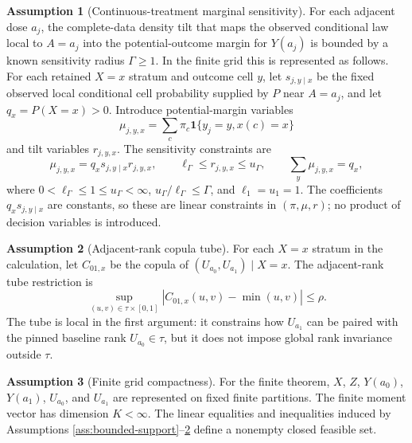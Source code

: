 \documentclass[11pt]{article}
\newcommand{\one}{\mathbf{1}}
\theoremstyle{definition}
\newtheorem{assumption}{Assumption}
\theoremstyle{plain}
\theoremstyle{remark}
\begin{document}
\begin{assumption}[Continuous-treatment marginal sensitivity]\label{ass:cmsm}
For each adjacent dose \(a_j\), the complete-data density tilt that maps the observed conditional law local to \(A=a_j\) into the potential-outcome margin for \(Y(a_j)\) is bounded by a known sensitivity radius \(\Gamma\ge1\).  In the finite grid this is represented as follows.  For each retained \(X=x\) stratum and outcome cell \(y\), let \(s_{j,y\mid x}\) be the fixed observed local conditional cell probability supplied by \(P\) near \(A=a_j\), and let \(q_x=P(X=x)>0\).  Introduce potential-margin variables
\[
\mu_{j,y,x}=\sum_c\pi_c\one\{y_j=y,x(c)=x\}
\]
and tilt variables \(r_{j,y,x}\).  The sensitivity constraints are
\[
\mu_{j,y,x}=q_xs_{j,y\mid x}r_{j,y,x},\qquad
\ell_\Gamma\le r_{j,y,x}\le u_\Gamma,\qquad
\sum_y\mu_{j,y,x}=q_x,
\]
where \(0<\ell_\Gamma\le1\le u_\Gamma<\infty\), \(u_\Gamma/\ell_\Gamma\le\Gamma\), and \(\ell_1=u_1=1\).  The coefficients \(q_xs_{j,y\mid x}\) are constants, so these are linear constraints in \((\pi,\mu,r)\); no product of decision variables is introduced.
\end{assumption}

\begin{assumption}[Adjacent-rank copula tube]\label{ass:tube}
For each \(X=x\) stratum in the calculation, let \(C_{01,x}\) be the copula of \((U_{a_0},U_{a_1})\mid X=x\).  The adjacent-rank tube restriction is
\[
\sup_{(u,v)\in\tau\times[0,1]}
\left|C_{01,x}(u,v)-\min(u,v)\right|\le \rho.
\]
The tube is local in the first argument: it constrains how \(U_{a_1}\) can be paired with the pinned baseline rank \(U_{a_0}\in\tau\), but it does not impose global rank invariance outside \(\tau\).
\end{assumption}

\begin{assumption}[Finite grid compactness]\label{ass:grid}
For the finite theorem, \(X\), \(Z\), \(Y(a_0)\), \(Y(a_1)\), \(U_{a_0}\), and \(U_{a_1}\) are represented on fixed finite partitions.  The finite moment vector has dimension \(K<\infty\).  The linear equalities and inequalities induced by Assumptions \ref{ass:bounded-support}--\ref{ass:tube} define a nonempty closed feasible set.
\end{assumption}
\end{document}
